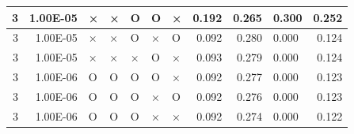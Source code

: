 \documentclass[11pt]{article}
\begin{document}
\begin{longtable}[h]{|r|r|l|l|l|l|l|r|r|l|r|}
3                                 & 1.00E-05                         & ×                                & ×                                & O                                & O                                & ×                                 & 0.192                             & 0.265                             & \multicolumn{1}{r|}{0.300}         & 0.252                               \\ \hline
3                                 & 1.00E-05                         & ×                                & ×                                & O                                & ×                                & O                                 & 0.092                             & 0.280                             & 0.000                              & 0.124                               \\ \hline
3                                 & 1.00E-05                         & ×                                & ×                                & ×                                & O                                & ×                                 & 0.093                             & 0.279                             & 0.000                              & 0.124                               \\ \hline
3                                 & 1.00E-06                         & O                                & O                                & O                                & O                                & ×                                 & 0.092                             & 0.277                             & 0.000                              & 0.123                               \\ \hline
3                                 & 1.00E-06                         & O                                & O                                & O                                & ×                                & O                                 & 0.092                             & 0.276                             & 0.000                              & 0.123                               \\ \hline
3                                 & 1.00E-06                         & O                                & O                                & O                                & ×                                & ×                                 & 0.092                             & 0.274                             & 0.000                              & 0.122                               \\ \hline

\end{longtable}
\end{document}
